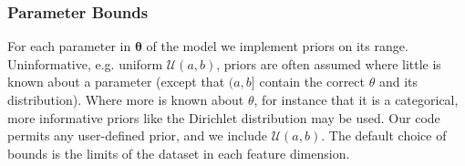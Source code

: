 \documentclass[twocolumn]{aastex631}
\newcommand{\mbs}[1]{\boldsymbol{#1}}
\newcommand{\mcal}[1]{\mathcal{#1}}
\begin{document}
        \subsubsection{Parameter Bounds} \label{ssub:parameter_bounds}

            For each parameter in $\mbs{\theta}$ of the model we implement priors on its range.
            Uninformative, e.g. uniform $\mcal{U}(a, b)$, priors are often assumed where little is known about a parameter (except that $(a,b]$ contain the correct $\theta$ and its distribution). Where more is known about $\theta$, for instance that it is a categorical, more informative priors like the Dirichlet distribution \citep{Bishop_Christopher_M_2016-08-23} may be used. Our code permits any user-defined prior, and we include $\mcal{U}(a, b)$.
            The default choice of bounds is the limits of the dataset in each feature dimension.
\end{document}
